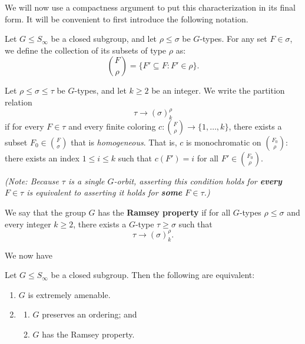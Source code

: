 We will now use a compactness argument to put this characterization in its final form. It will be convenient to first introduce the following notation.

\begin{definition}
    \label{def:ramsey_property}
    Let $G \le S_\infty$ be a closed subgroup, and let $\rho \le \sigma$ be $G$-types. For any set $F \in \sigma$, we define the collection of its subsets of type $\rho$ as:
    $$
        \binom{F}{\rho} = \{F' \subseteq F : F' \in \rho\}.
    $$

    Let $\rho \le \sigma \le \tau$ be $G$-types, and let $k \ge 2$ be an integer. We write the partition relation
    $$
        \tau \to (\sigma)^\rho_k
    $$
    if for every $F \in \tau$ and every finite coloring $c: \binom{F}{\rho} \to \{1, \dots, k\}$, there exists a subset $F_0 \in \binom{F}{\sigma}$ that is \textit{homogeneous}. That is, $c$ is monochromatic on $\binom{F_0}{\rho}$: there exists an index $1 \le i \le k$ such that $c(F') = i$ for all $F' \in \binom{F_0}{\rho}$.

    \textit{(Note: Because $\tau$ is a single $G$-orbit, asserting this condition holds for \textbf{every} $F \in \tau$ is equivalent to asserting it holds for \textbf{some} $F \in \tau$.)}

    We say that the group $G$ has the \textbf{Ramsey property} if for all $G$-types $\rho \le \sigma$ and every integer $k \ge 2$, there exists a $G$-type $\tau \ge \sigma$ such that
    $$
        \tau \to (\sigma)^\rho_k.
    $$
\end{definition}

We now have

\begin{theorem}
    \label{thm:ea_ordering_ramsey_equiv}
    Let $G \le S_\infty$ be a closed subgroup. Then the following are equivalent:
    \begin{enumerate}
        \item[(i)] $G$ is extremely amenable.
        \item[(ii)]
              \begin{enumerate}
                  \item[\textbf{(a)}] $G$ preserves an ordering; and
                  \item[\textbf{(b)}] $G$ has the Ramsey property.
              \end{enumerate}
    \end{enumerate}
\end{theorem}

